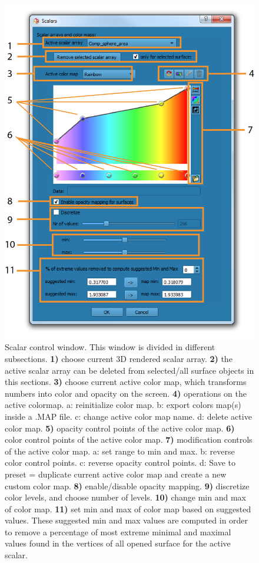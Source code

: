 \begin{figure}
  \centering
  \includegraphics[scale=1]{images/11/scalar_rendering_option_window2.png}
\caption{Scalar control window. This window is divided in different subsections. \textbf{1)} choose current 3D rendered scalar array.  \textbf{2)} the active scalar array can be deleted from selected/all surface objects in this sections. \textbf{3)} choose current active color map, which transforms numbers into color and opacity on the screen. \textbf{4)} operations on the active colormap. a: reinitialize color map. b: export colors map(s) inside a .MAP file. c: change active color map name. d: delete active color map. \textbf{5)} opacity control points of the active color map. \textbf{6)} color control points of the active color map. \textbf{7)} modification controls of the active color map. a: set range to min and max. b: reverse color control points. c: reverse opacity control points. d: Save to preset = duplicate current active color map and create a new custom color map. \textbf{8)} enable/disable opacity mapping. \textbf{9)} discretize color levels, and choose number of levels. \textbf{10)} change min and max of color map. \textbf{11)} set min and max of color map based on suggested values. These suggested min and max values are computed in order to remove a percentage of most extreme minimal and maximal values found in the vertices of all opened surface for the active scalar.}	
\label{scalar_rendering_options_window}
 \end{figure}


